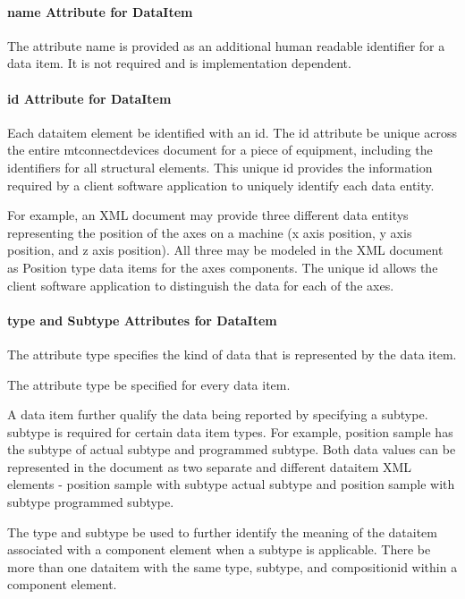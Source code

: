 \documentclass{mtconnect}	%
\begin{document}
\paragraph{name Attribute for DataItem}\mbox{}

The attribute \gls{name} is provided as an additional human readable identifier for a data item.  It is not required and is implementation dependent.

\paragraph{id Attribute for DataItem}\mbox{}

Each \gls{dataitem} element \must be identified with an \gls{id}.   The \gls{id} attribute \must be unique across the entire \gls{mtconnectdevices} document for a piece of equipment, including the identifiers for all \glspl{structural element}.  This unique \gls{id} provides the information required by a client software application to uniquely identify each \gls{data entity}.

For example, an XML document may provide three different \glspl{data entity} representing the position of the axes on a machine (x axis position, y axis position, and z axis position).  All three may be modeled in the XML document as Position type data items for the \gls{axes} components.  The unique \gls{id} allows the client software application to distinguish the data for each of the axes.

\paragraph{type and Subtype Attributes for DataItem}\mbox{}

The attribute \gls{type} specifies the kind of data that is represented by the data item.

The attribute \gls{type} \must be specified for every data item.

A data item \may further qualify the data being reported by specifying a \gls{subtype}.  \gls{subtype} is required for certain data item \glspl{type}.  For example, \gls{position sample} has the \gls{subtype} of \gls{actual subtype} and \gls{programmed subtype}.  Both data values can be represented in the document as two separate and different \gls{dataitem} XML elements - \gls{position sample} with \gls{subtype} \gls{actual subtype} and \gls{position sample} with \gls{subtype} \gls{programmed subtype}.

The \gls{type} and \gls{subtype} \should be used to further identify the meaning of the \gls{dataitem} associated with a \gls{component} element when a \gls{subtype} is applicable.  There \shouldnot be more than one \gls{dataitem} with the same \gls{type}, \gls{subtype}, and \gls{compositionid} within a \gls{component} element.
\end{document}
